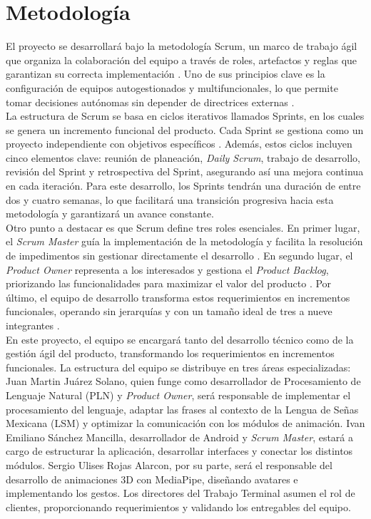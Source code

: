 \newpage
\section{Metodología}
El proyecto se desarrollará bajo la metodología Scrum, un marco de trabajo ágil que organiza la colaboración del equipo a través de roles, artefactos y reglas que garantizan su correcta implementación \cite{ref16}\cite{ref17}. Uno de sus principios clave es la configuración de equipos autogestionados y multifuncionales, lo que permite tomar decisiones autónomas sin depender de directrices externas \cite{ref17}.\\

La estructura de Scrum se basa en ciclos iterativos llamados Sprints, en los cuales se genera un incremento funcional del producto. Cada Sprint se gestiona como un proyecto independiente con objetivos específicos \cite{ref17}. Además, estos ciclos incluyen cinco elementos clave: reunión de planeación, \textit{Daily Scrum}, trabajo de desarrollo, revisión del Sprint y retrospectiva del Sprint, asegurando así una mejora continua en cada iteración. Para este desarrollo, los Sprints tendrán una duración de entre dos y cuatro semanas, lo que facilitará una transición progresiva hacia esta metodología y garantizará un avance constante.\\

Otro punto a destacar es que Scrum define tres roles esenciales. En primer lugar, el \textit{Scrum Master} guía la implementación de la metodología y facilita la resolución de impedimentos sin gestionar directamente el desarrollo \cite{ref18}. En segundo lugar, el \textit{Product Owner} representa a los interesados y gestiona el \textit{Product Backlog}, priorizando las funcionalidades para maximizar el valor del producto \cite{ref18}. Por último, el equipo de desarrollo transforma estos requerimientos en incrementos funcionales, operando sin jerarquías y con un tamaño ideal de tres a nueve integrantes \cite{ref18}.\\

En este proyecto, el equipo se encargará tanto del desarrollo técnico como de la gestión ágil del producto, transformando los requerimientos en incrementos funcionales. La estructura del equipo se distribuye en tres áreas especializadas: Juan Martin Juárez Solano, quien funge como desarrollador de Procesamiento de Lenguaje Natural (PLN) y \textit{Product Owner}, será responsable de implementar el procesamiento del lenguaje, adaptar las frases al contexto de la Lengua de Señas Mexicana (LSM) y optimizar la comunicación con los módulos de animación. Ivan Emiliano Sánchez Mancilla, desarrollador de Android y \textit{Scrum Master}, estará a cargo de estructurar la aplicación, desarrollar interfaces y conectar los distintos módulos. Sergio Ulises Rojas Alarcon, por su parte, será el responsable del desarrollo de animaciones 3D con MediaPipe, diseñando avatares e implementando los gestos. Los directores del Trabajo Terminal asumen el rol de clientes, proporcionando requerimientos y validando los entregables del equipo.\\

